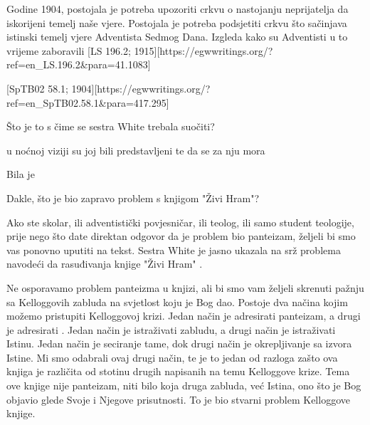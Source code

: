 Godine 1904, postojala je potreba upozoriti crkvu o nastojanju neprijatelja da iskorijeni temelj naše vjere. Postojala je potreba podsjetiti crkvu što sačinjava istinski temelj vjere Adventista Sedmog Dana. Izgleda kako su Adventisti u to vrijeme zaboravili [LS 196.2; 1915][https://egwwritings.org/?ref=en\_LS.196.2&para=41.1083]

[SpTB02 58.1; 1904][https://egwwritings.org/?ref=en\_SpTB02.58.1&para=417.295]

Što je to s čime se sestra White trebala suočiti?

 u noćnoj viziji su joj bili predstavljeni  te da se za nju mora  

Bila je 

Dakle, što je bio zapravo problem s knjigom "Živi Hram"?

Ako ste skolar, ili adventistički povjesničar, ili teolog, ili samo student teologije, prije nego što date direktan odgovor da je problem bio panteizam, željeli bi smo vas ponovno uputiti na tekst. Sestra White je jasno ukazala na srž problema navodeći da rasuđivanja knjige "Živi Hram" .

Ne osporavamo problem panteizma u knjizi, ali bi smo vam željeli skrenuti pažnju sa Kelloggovih zabluda na svjetlost koju je Bog dao. Postoje dva načina kojim možemo pristupiti Kelloggovoj krizi. Jedan način je adresirati panteizam, a drugi je adresirati . Jedan način je istraživati zabludu, a drugi način je istraživati Istinu. Jedan način je seciranje tame, dok drugi način je okrepljivanje sa izvora Istine. Mi smo odabrali ovaj drugi način, te je to jedan od razloga zašto ova knjiga je različita od stotinu drugih napisanih na temu Kelloggove krize. Tema ove knjige nije panteizam, niti bilo koja druga zabluda, već Istina, ono što je Bog objavio glede Svoje  i Njegove prisutnosti. To je bio stvarni problem Kelloggove knjige.

